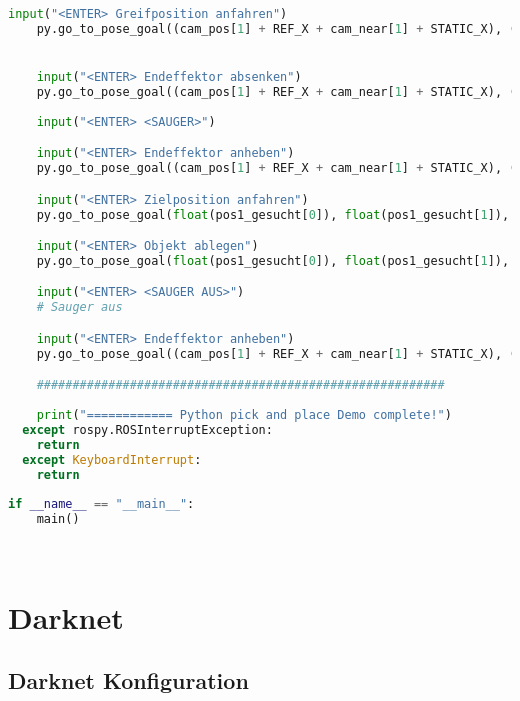 \begin{lstlisting}[language=python]
    input("<ENTER> Greifposition anfahren")
    py.go_to_pose_goal((cam_pos[1] + REF_X + cam_near[1] + STATIC_X), (cam_pos[2] + REF_Y + cam_near[2] + STATIC_Y), (REF_Z - cam_pos[3] + STATIC_Z - (cam_near[3] - SCAN_NEAR)))


    input("<ENTER> Endeffektor absenken")
    py.go_to_pose_goal((cam_pos[1] + REF_X + cam_near[1] + STATIC_X), (cam_pos[2] + REF_Y + cam_near[2] + STATIC_Y), (REF_Z - cam_pos[3] + STATIC_Z - (cam_near[3] - SCAN_NEAR) - 0.25))
    
    input("<ENTER> <SAUGER>")

    input("<ENTER> Endeffektor anheben")
    py.go_to_pose_goal((cam_pos[1] + REF_X + cam_near[1] + STATIC_X), (cam_pos[2] + REF_Y + cam_near[2] + STATIC_Y), (REF_Z - cam_pos[3] + STATIC_Z - (cam_near[3] - SCAN_NEAR)))

    input("<ENTER> Zielposition anfahren")
    py.go_to_pose_goal(float(pos1_gesucht[0]), float(pos1_gesucht[1]), (float(pos1_gesucht[2]) + height2 + TCP))

    input("<ENTER> Objekt ablegen")
    py.go_to_pose_goal(float(pos1_gesucht[0]), float(pos1_gesucht[1]), (float(pos1_gesucht[2]) + height2 + TCP - 0.25))

    input("<ENTER> <SAUGER AUS>")
    # Sauger aus

    input("<ENTER> Endeffektor anheben")
    py.go_to_pose_goal((cam_pos[1] + REF_X + cam_near[1] + STATIC_X), (cam_pos[2] + REF_Y + cam_near[2] + STATIC_Y), (REF_Z - cam_pos[3] + STATIC_Z - (cam_near[3] - SCAN_NEAR)))

    #########################################################
    
    print("============ Python pick and place Demo complete!")
  except rospy.ROSInterruptException:
    return
  except KeyboardInterrupt:
    return
    
if __name__ == "__main__":
    main()

   
\end{lstlisting}

\newpage\section{Darknet} \label{sec:darknet}

\subsection{Darknet Konfiguration} \label{subsec:darknet_config}

